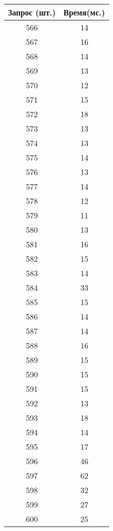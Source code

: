 \begin{table}[H]
\begin{minipage}{.4\textwidth}
		\begin{tabular}{|c|c|}
			\hline
			Запрос (шт.)& Время(мс.) \\
			\hline
			566 & 14  \\
			567 & 16  \\
			568 & 14  \\
			569 & 13  \\
			570 & 12  \\
			571 & 15  \\
			572 & 18  \\
			573 & 13  \\
			574 & 13  \\
			575 & 14  \\
			576 & 13  \\
			577 & 14  \\
			578 & 12  \\
			579 & 11  \\
			580 & 13  \\
			581 & 16  \\
			582 & 15  \\
			583 & 14  \\
			584 & 33  \\
			585 & 15  \\
			586 & 14  \\
			587 & 14  \\
			588 & 16  \\
			589 & 15  \\
			590 & 15  \\
			591 & 15  \\
			592 & 13  \\
			593 & 18  \\
			594 & 14  \\
			595 & 17  \\
			596 & 46  \\
			597 & 62  \\
			598 & 32  \\
			599 & 27  \\
			600 & 25   \\
			\hline
		\end{tabular}
		\label{tab:512}
	\end{minipage}
\end{table}

